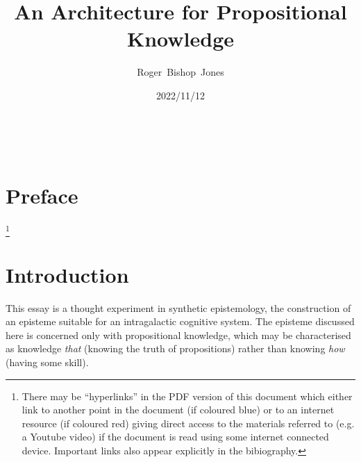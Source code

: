 \documentclass[10pt,titlepage]{article}
\title{\LARGE\bf An Architecture for Propositional Knowledge}
\author{Roger~Bishop~Jones}
\date{\small 2022/11/12}
\newcommand{\ignore}[1]{}
\begin{document}
                               
\begin{titlepage}
\maketitle





\end{titlepage}

\ \

\ignore{
\begin{centering}
{}
\end{centering}
}%

\setcounter{tocdepth}{2}
{\parskip-0pt\tableofcontents}


\pagebreak

\section*{Preface}



\footnote{There may be ``hyperlinks'' in the PDF version of this document which either link to another point in the document  (if coloured blue) or to an internet resource  (if coloured red) giving direct access to the materials referred to (e.g. a Youtube video) if the document is read using some internet connected device.
Important links also appear explicitly in the bibiography.}

\section{Introduction}

This essay is a thought experiment in synthetic epistemology, the construction of an episteme suitable for an intragalactic cognitive system.
The episteme discussed here is concerned only with propositional knowledge, which may be characterised as knowledge \emph{that} (knowing the truth of propositions) rather than knowing \emph{how} (having some skill).
\end{document}
